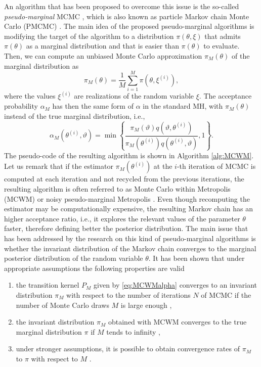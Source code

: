 An algorithm that has been proposed to overcome this issue is the so-called \textit{pseudo-marginal} MCMC \cite{DPD15}, which is also known as particle Markov chain Monte Carlo (PMCMC) \cite{ADH10}. The main idea of the proposed pseudo-marginal algorithms is modifying the target of the algorithm to a distribution $\pi(\theta, \xi)$ that admits $\pi(\theta)$ as a marginal distribution and that is easier than $\pi(\theta)$ to evaluate. Then, we can compute an unbiased Monte Carlo approximation $\pi_M(\theta)$ of the marginal distribution as
\begin{equation}\label{eq:MCWMestimators}
	\pi_M(\theta) = \frac{1}{M} \sum_{i = 1}^{M} \pi(\theta, \xi^{(i)}),
\end{equation}
where the values $\xi^{(i)}$ are realizations of the random variable $\xi$. The acceptance probability $\alpha_M$ has then the same form of $\alpha$ in the standard MH, with $\pi_M(\theta)$ instead of the true marginal distribution, i.e.,
\begin{equation}\label{eq:MCWMalpha}
	\alpha_M(\theta^{(i)}, \vartheta) = \min\left\{\frac{\pi_M(\vartheta)q(\vartheta, \theta^{(i)})}{\pi_M(\theta^{(i)})q(\theta^{(i)}, \vartheta)}, 1\right\}.
\end{equation}
The pseudo-code of the resulting algorithm is shown in Algorithm \ref{alg:MCWM}. Let us remark that if the estimator $\pi_M(\theta^{(i)})$ at the $i$-th iteration of MCMC is computed at each iteration and not recycled from the previous iterations, the resulting algorithm is often referred to as Monte Carlo within Metropolis (MCWM) \cite{AnR09} or noisy pseudo-marginal Metropolis \cite{MLR16}. Even though recomputing the estimator may be computationally expensive, the resulting Markov chain has an higher acceptance ratio, i.e., it explores the relevant values of the parameter $\theta$ faster, therefore defining better the posterior distribution. The main issue that has been addressed by the research on this kind of pseudo-marginal algorithms is whether the invariant distribution of the Markov chain converges to the marginal posterior distribution of the random variable $\theta$. It has been shown \cite{AnR09, MLR16} that under appropriate assumptions the following properties are valid
\begin{enumerate}
	\item the transition kernel $P_M$ given by \eqref{eq:MCWMalpha} converges to an invariant distribution $\pi_M$ with respect to the number of iterations $N$ of MCMC if the number of Monte Carlo draws $M$ is large enough \cite[Theorem 9]{AnR09},
	\item the invariant distribution $\pi_M$ obtained with MCWM converges to the true marginal distribution $\pi$ if $M$ tends to infinity \cite[Theorem 4.1]{MLR16},
	\item under stronger assumptions, it is possible to obtain convergence rates of $\pi_M$ to $\pi$ with respect to $M$ \cite[Theorem 4.2 and Proposition 4.1]{MLR16}.
\end{enumerate}
